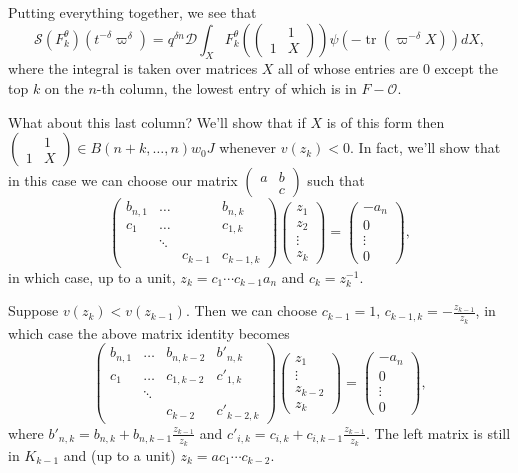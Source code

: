 \documentclass{amsart}
\theoremstyle{definition}
\newcommand{\tr}{\operatorname{tr}}
\begin{document}
{Putting everything together, we see that
\[\mathcal{S}(F^\theta_k)(t^{-\delta}\varpi^\delta )=q^{\delta n}\mathcal{D}\int_{X} F_k^\theta\left(\begin{pmatrix}&1\\1&X\end{pmatrix}\right)\psi(-\tr(\varpi^{-\delta}X))dX,\]
where the integral is taken over matrices $X$ all of whose
entries are 0 except the top $k$ on the $n$-th column, the lowest entry of which is in $F-\mathcal{O}$.

What about this last column? We'll show that if $X$ is of this form then $\begin{pmatrix}&1\\1&X\end{pmatrix}\in B(n+k,\ldots,n)w_0J$ whenever $v(z_k)<0$. In fact, we'll show that in this case we can choose our matrix $\begin{pmatrix} a&b\\&c\end{pmatrix}$ such that  
\[
\begin{pmatrix}
b_{n,1}&\ldots&&b_{n,k}\\
c_1&\ldots &&c_{1,k}\\
& \ddots &&\\
&&c_{k-1}&c_{k-1,k}
\end{pmatrix}\begin{pmatrix} z_1\\z_2\\\vdots\\z_k\end{pmatrix}=\begin{pmatrix} -a_n\\0\\\vdots\\0\end{pmatrix},
\]
in which case, up to a unit, $z_k = c_1\cdots c_{k-1}a_n$ and
$c_k = z_k^{-1}$. 

Suppose $v(z_k)<v(z_{k-1})$. Then we can choose $c_{k-1}=1$,
$c_{k-1,k}=-\frac{z_{k-1}}{z_k}$, in which case the above matrix
identity becomes
\[\begin{pmatrix}
b_{n,1}&\ldots&b_{n,k-2}&b'_{n,k}\\
c_1&\ldots &c_{1,k-2}&c'_{1,k}\\
& \ddots &&\\
&&c_{k-2}&c'_{k-2,k}
\end{pmatrix}\begin{pmatrix}
z_1\\\vdots\\z_{k-2}\\z_k\end{pmatrix}=\begin{pmatrix}
-a_n\\0\\\vdots\\0\end{pmatrix},\]
where $b'_{n,k}=b_{n,k}+b_{n,k-1}\frac{z_{k-1}}{z_k}$ and
$c'_{i,k}=c_{i,k}+c_{i,k-1}\frac{z_{k-1}}{z_k}$. The left matrix
is still in $K_{k-1}$ and (up to a unit) $z_k=ac_1\cdots c_{k-2}$.

}
\end{document}
